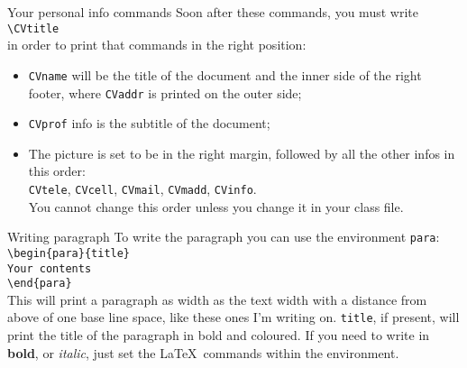 \documentclass[english]{michael-cv}
\begin{document}
\begin{para}{Your personal info commands}
Soon after these commands, you must write\\
\null\hspace{4ex}\verb+\CVtitle+\\[1ex]
in order to print that commands in the right position:
\begin{itemize}
\item \texttt{CVname} will be the title of the document and the inner side of the right footer, where \texttt{CVaddr} is printed on the outer side;
\item \texttt{CVprof} info is the subtitle of the document;
\item The picture is set to be in the right margin, followed by all the other infos in this order:\\
\texttt{CVtele}, \texttt{CVcell}, \texttt{CVmail}, \texttt{CVmadd}, \texttt{CVinfo}.\\
You cannot change this order unless you change it in your class file.
\end{itemize}
\end{para}

\begin{para}{Writing paragraph}
To write the paragraph you can use the environment \texttt{para}:\\
\null\hspace{4ex}\verb+\begin{para}{title}+\\
\null\hspace{4ex}\verb+Your contents+\\
\null\hspace{4ex}\verb+\end{para}+\\[1ex]
This will print a paragraph as width as the text width with a distance from above of one base line space, like these ones I'm writing on. \texttt{title}, if present, will print the title of the paragraph in bold and coloured. If you need to write in \textbf{bold}, or \textit{italic}, just set the \LaTeX\ commands within the environment.
\end{para}
\end{document}
